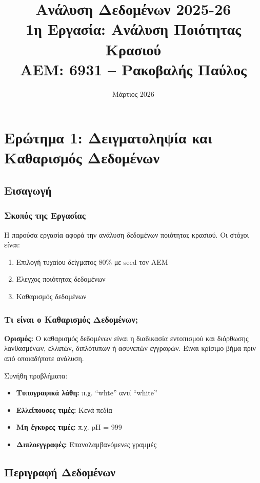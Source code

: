 \documentclass[12pt,a4paper]{article}
\title{
    \textbf{Ανάλυση Δεδομένων 2025-26}\\[0.3cm]
    \large 1η Εργασία: Ανάλυση Ποιότητας Κρασιού\\[0.2cm]
    \normalsize AEM: 6931 -- Ρακοβαλής Παύλος
}
\author{}
\date{Μάρτιος 2026}
\begin{document}
\maketitle
\tableofcontents
\newpage

\section{Ερώτημα 1: Δειγματοληψία και Καθαρισμός Δεδομένων}

\subsection{Εισαγωγή}

\subsubsection{Σκοπός της Εργασίας}

Η παρούσα εργασία αφορά την ανάλυση δεδομένων ποιότητας κρασιού. Οι στόχοι είναι:

\begin{enumerate}
    \item Επιλογή τυχαίου δείγματος 80\% με seed τον ΑΕΜ
    \item Έλεγχος ποιότητας δεδομένων
    \item Καθαρισμός δεδομένων
\end{enumerate}

\subsubsection{Τι είναι ο Καθαρισμός Δεδομένων;}

\textbf{Ορισμός:} Ο καθαρισμός δεδομένων είναι η διαδικασία εντοπισμού και διόρθωσης λανθασμένων, ελλιπών, διπλότυπων ή ασυνεπών εγγραφών. Είναι κρίσιμο βήμα πριν από οποιαδήποτε ανάλυση.

Συνήθη προβλήματα:
\begin{itemize}
    \item \textbf{Τυπογραφικά λάθη:} π.χ. ``whte'' αντί ``white''
    \item \textbf{Ελλείπουσες τιμές:} Κενά πεδία
    \item \textbf{Μη έγκυρες τιμές:} π.χ. pH = 999
    \item \textbf{Διπλοεγγραφές:} Επαναλαμβανόμενες γραμμές
\end{itemize}

\subsection{Περιγραφή Δεδομένων}
\end{document}
